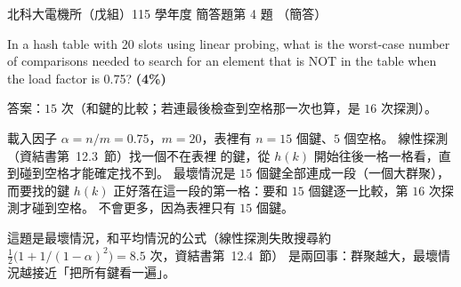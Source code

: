 \begin{pastexam}[label={px:ntut-115-ee-ds-19}]{北科大電機所（戊組）115 學年度 簡答題第 4 題}
（簡答）

In a hash table with 20 slots using linear probing, what is the worst-case number of comparisons
needed to search for an element that is NOT in the table when the load factor is 0.75? \textbf{(4\%)}
\end{pastexam}

\begin{pastsoln}
答案：$15$ 次（和鍵的比較；若連最後檢查到空格那一次也算，是 $16$ 次探測）。

載入因子 $\alpha = n/m = 0.75$，$m = 20$，表裡有 $n = 15$ 個鍵、$5$ 個空格。 線性探測（資結書第~12.3~節）找一個不在表裡
的鍵，從 $h(k)$ 開始往後一格一格看，直到碰到空格才能確定找不到。 最壞情況是 $15$ 個鍵全部連成一段（一個大群聚），
而要找的鍵 $h(k)$ 正好落在這一段的第一格：要和 $15$ 個鍵逐一比較，第 $16$ 次探測才碰到空格。 不會更多，因為表裡只有
$15$ 個鍵。

這題是最壞情況，和平均情況的公式（線性探測失敗搜尋約 $\frac12\bigl(1 + 1/(1-\alpha)^2\bigr) = 8.5$ 次，資結書第~12.4~節）
是兩回事：群聚越大，最壞情況越接近「把所有鍵看一遍」。
\end{pastsoln}
